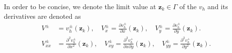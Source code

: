 In order to be concise, we denote the limit value at $\mathbf{z}_{k} \in \Gamma$ of the $v_{h}$ and its derivatives are denoted as
\begin{equation}
\begin{aligned}
    V^{\pm} & = v_{h}^{\pm}(\mathbf{z}_{k}), \quad V_{x}^{\pm} = \frac{\partial v_{h}^{\pm}}{\partial x}(\mathbf{z}_{k}), \quad V_{y}^{\pm} = \frac{\partial v_{h}^{\pm}}{\partial y}(\mathbf{z}_{k}). \\
    V_{xx}^{\pm} & = \frac{\partial^{2} v_{h}^{\pm}}{\partial x^{2}}(\mathbf{z}_{k}), \quad V_{xy}^{\pm} = \frac{\partial^{2} v_{h}^{+}}{\partial x\partial y}(\mathbf{z}_{k}), \quad V_{yy}^{\pm} = \frac{\partial^{2} v_{h}^{+}}{\partial y^{2}}(\mathbf{z}_{k}).
\end{aligned}\label{one_GPU:substitude}
\end{equation}

